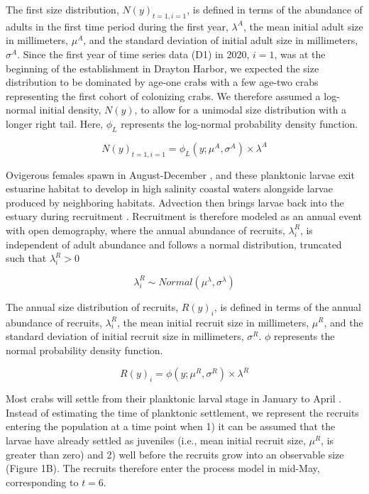 \documentclass{article}
\begin{document}
The first size distribution, $N(y)_{t=1, i=1}$, is defined in terms of the abundance of adults in the first time period during the first year, $\lambda^{A}$, the mean initial adult size in millimeters, $\mu^A$, and the standard deviation of initial adult size in millimeters, $\sigma^A$. Since the first year of time series data (D1) in 2020, $i = 1$, was at the beginning of the establishment in Drayton Harbor, we expected the size distribution to be dominated by age-one crabs with a few age-two crabs representing the first cohort of colonizing crabs. We therefore assumed a log-normal initial density, $N(y)$, to allow for a unimodal size distribution with a longer right tail. Here, $\phi_L$ represents the log-normal probability density function.

\begin{equation}
N(y)_{t=1, i=1} = \phi_L(y; \mu^A, \sigma^A) \times \lambda^A
\end{equation}

Ovigerous females spawn in August-December \parencite{klassen2007biological}, and these planktonic larvae exit estuarine habitat to develop in high salinity coastal waters alongside larvae produced by neighboring habitats. Advection then brings larvae back into the estuary during recruitment \parencite{young2019life}. Recruitment is therefore modeled as an annual event with open demography, where the annual abundance of recruits, $\lambda^R_i$, is independent of adult abundance and follows a normal distribution, truncated such that $\lambda^R_i > 0$  

\begin{equation}
\lambda^R_i \sim Normal(\mu^{\lambda}, \sigma^{\lambda})
\end{equation}

The annual size distribution of recruits, $R(y)_{i}$, is defined in terms of the annual abundance of recruits, $\lambda^R_i$, the mean initial recruit size in millimeters, $\mu^R$, and the standard deviation of initial recruit size in millimeters, $\sigma^R$. $\phi$ represents the normal probability density function.

\begin{equation}
R(y)_{i} = \phi(y; \mu^R, \sigma^R) \times \lambda^R
\end{equation}

Most crabs will settle from their planktonic larval stage in January to April \parencite{yamada2005growth}. Instead of estimating the time of planktonic settlement, we represent the recruits entering the population at a time point when 1) it can be assumed that the larvae have already settled as juveniles (i.e., mean initial recruit size, $\mu^R$, is greater than zero) and 2) well before the recruits grow into an observable size (Figure 1B). The recruits therefore enter the process model in mid-May, corresponding to $t=6$. 
\end{document}
